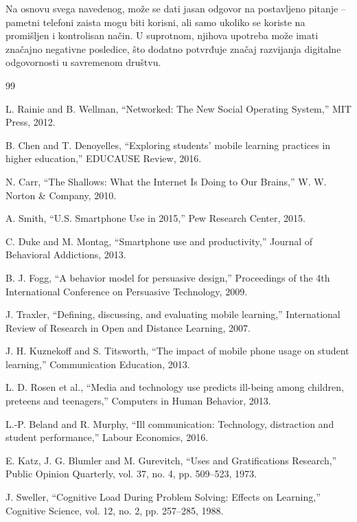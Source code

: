 \documentclass{article}
\begin{document}
Na osnovu svega navedenog, može se dati jasan odgovor na postavljeno pitanje – pametni telefoni zaista mogu biti korisni, ali samo ukoliko se koriste na promišljen i kontrolisan način. U suprotnom, njihova upotreba može imati značajno negativne posledice, što dodatno potvrđuje značaj razvijanja digitalne odgovornosti u savremenom društvu.



\newpage
\begin{thebibliography}{99}

L. Rainie and B. Wellman, ``Networked: The New Social Operating System,'' MIT Press, 2012.

B. Chen and T. Denoyelles, ``Exploring students’ mobile learning practices in higher education,'' EDUCAUSE Review, 2016.

N. Carr, ``The Shallows: What the Internet Is Doing to Our Brains,'' W. W. Norton \& Company, 2010.

A. Smith, ``U.S. Smartphone Use in 2015,'' Pew Research Center, 2015.

C. Duke and M. Montag, ``Smartphone use and productivity,'' Journal of Behavioral Addictions, 2013.

B. J. Fogg, ``A behavior model for persuasive design,'' Proceedings of the 4th International Conference on Persuasive Technology, 2009.

J. Traxler, ``Defining, discussing, and evaluating mobile learning,'' International Review of Research in Open and Distance Learning, 2007.

J. H. Kuznekoff and S. Titsworth, ``The impact of mobile phone usage on student learning,'' Communication Education, 2013.

L. D. Rosen et al., ``Media and technology use predicts ill-being among children, preteens and teenagers,'' Computers in Human Behavior, 2013.

L.-P. Beland and R. Murphy, ``Ill communication: Technology, distraction and student performance,'' Labour Economics, 2016.

E. Katz, J. G. Blumler and M. Gurevitch, ``Uses and Gratifications Research,'' Public Opinion Quarterly, vol. 37, no. 4, pp. 509--523, 1973.

J. Sweller, ``Cognitive Load During Problem Solving: Effects on Learning,'' Cognitive Science, vol. 12, no. 2, pp. 257--285, 1988.


\end{thebibliography}
\end{document}
